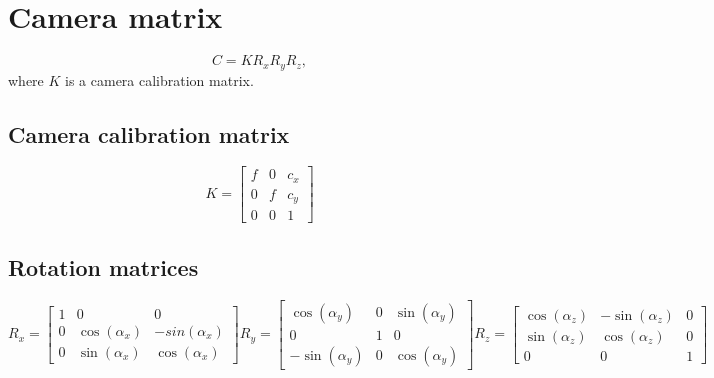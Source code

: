 \documentclass{article}
\begin{document}
\section{Camera matrix}

\begin{equation}
C = K R_x R_y R_z,
\end{equation}
where $K$ is a camera calibration matrix.

\subsection{Camera calibration matrix}

\begin{equation}
K = \begin{bmatrix}
f & 0 & c_x \\
0 & f & c_y \\
0 & 0 & 1
\end{bmatrix}
\end{equation}

\subsection{Rotation matrices}

\begin{subequations}
\begin{equation}
R_x = \begin{bmatrix}
1 & 0 & 0 \\
0 & \cos(\alpha_x) & -sin(\alpha_x) \\
0 & \sin(\alpha_x) & \cos(\alpha_x)
\end{bmatrix}
\end{equation}

\begin{equation}
R_y = \begin{bmatrix}
\cos(\alpha_y) & 0 & \sin(\alpha_y) \\
0 & 1 & 0 \\
-\sin(\alpha_y) & 0 & \cos(\alpha_y)
\end{bmatrix}
\end{equation}

\begin{equation}
R_z = \begin{bmatrix}
\cos(\alpha_z) & -\sin(\alpha_z) & 0 \\
\sin(\alpha_z) & \cos(\alpha_z) & 0 \\
0 & 0 & 1
\end{bmatrix}
\end{equation}
\end{subequations}
\end{document}
